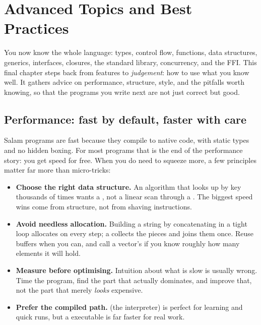 \chapter{Advanced Topics and Best Practices}%
\label{ch:advanced}

You now know the whole language: types, control flow, functions, data structures,
generics, interfaces, closures, the standard library, concurrency, and the FFI.
This final chapter steps back from features to \emph{judgement}: how to use what
you know well. It gathers advice on performance, structure, style, and the
pitfalls worth knowing, so that the programs you write next are not just correct
but good.

\section{Performance: fast by default, faster with care}

Salam programs are fast because they compile to native code, with static types
and no hidden boxing. For most programs that is the end of the performance
story: you get speed for free. When you do need to squeeze more, a
few principles matter far more than micro-tricks:

\begin{itemize}[leftmargin=1.4em]
  \item \textbf{Choose the right data structure.} An algorithm that looks up by
        key thousands of times wants a , not a linear scan through a
        . The biggest speed wins come from structure, not from
        shaving instructions.
  \item \textbf{Avoid needless allocation.} Building a string by concatenating in
        a tight loop allocates on every step; a  collects the
        pieces and joins them once. Reuse buffers when you can, and call a
        vector's  if you know roughly how many elements it will
        hold.
  \item \textbf{Measure before optimising.} Intuition about what is slow is
        usually wrong. Time the program, find the part that actually dominates,
        and improve that, not the part that merely \emph{looks} expensive.
  \item \textbf{Prefer the compiled path.}  (the interpreter) is
        perfect for learning and quick runs, but a  executable
        is far faster for real work.
\end{itemize}

